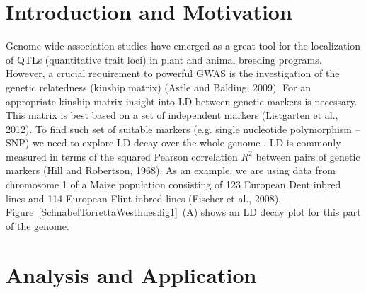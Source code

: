 \documentclass[twoside]{report}
\begin{document}
\section{Introduction and Motivation}
Genome-wide association studies have emerged as a great tool for the 
localization of QTLs (quantitative trait loci) in plant and animal breeding programs.
However, a crucial requirement to powerful GWAS is the investigation of the genetic 
relatedness (kinship matrix) (Astle and Balding, 2009). 
For an appropriate kinship matrix insight into LD between 
genetic markers is necessary. This matrix is best based on a set of independent markers 
(Listgarten et al., 2012).
To find such set of suitable markers (e.g. single nucleotide polymorphism -- SNP) we need 
to explore LD decay over the whole genome . LD is commonly measured in terms of 
the squared Pearson correlation $R^2$ between pairs of genetic
markers (Hill and Robertson, 1968). As an example, we are using data from chromosome 1 of a Maize 
population consisting of 123 European Dent inbred lines and 114 European Flint inbred lines
(Fischer et al., 2008). Figure~\ref{SchnabelTorrettaWesthues:fig1}~(A) shows an LD decay plot 
for this part of the genome. 

\section{Analysis and Application}
\end{document}
